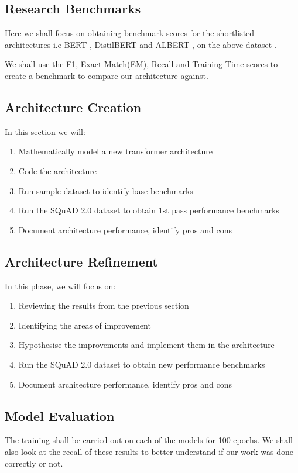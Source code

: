 \documentclass[11pt]{article}
\begin{document}
	\subsection{Research Benchmarks}\label{benchmarks}
	Here we shall focus on obtaining benchmark scores for the shortlisted architectures i.e BERT \citep{bert}, DistilBERT \citep{distil} and ALBERT \cite{albert}, on the above dataset \citep{dataset}.

	We shall use the F1, Exact Match(EM), Recall and Training Time scores to create a benchmark to compare our architecture against.

	\subsection{Architecture Creation}\label{architecturecreation}
	In this section we will:

	\begin{enumerate}
		\item{Mathematically model a new transformer architecture}
		\item{Code the architecture}
		\item{Run sample dataset to identify base benchmarks}
		\item{Run the SQuAD 2.0 dataset to obtain 1st pass performance benchmarks}
		\item{Document architecture performance, identify pros and cons}
	\end{enumerate}
	\subsection{Architecture Refinement}\label{refinement}
	In this phase, we will focus on:
	\begin{enumerate}
		\item{Reviewing the results from the previous section}
		\item{Identifying the areas of improvement}
		\item{Hypothesise the improvements and implement them in the architecture}
		\item{Run the SQuAD 2.0 dataset to obtain new performance benchmarks}
		\item{Document architecture performance, identify pros and cons}
	\end{enumerate}
	\subsection{Model Evaluation}
	The training shall be carried out on each of the models for 100 epochs.
    We shall also look at the recall of these results to better understand if our work was done correctly or not.
\end{document}
